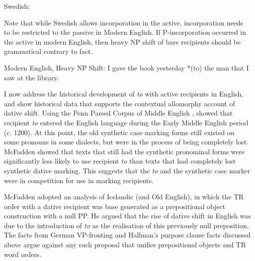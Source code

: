 		\begin{exe}
			\ex Swedish:\label{ex:Swedish-complex-act}
			\begin{xlist}
			\end{xlist}
		\end{exe}
		Note that while Swedish allows incorporation in the active, incorporation needs to be restricted to the passive in Modern English. If P-incorporation occurred in the active in modern English, then heavy NP shift of bare recipients should be grammatical contrary to fact.
		\begin{exe}
			\ex Modern English, Heavy NP Shift: I gave the book yesterday *(to) the man that I saw at the library.
		\end{exe}
		I now address the historical development of \textit{to} with active recipients in English, and show historical data that supports the contextual allomorphy account of dative shift. Using the Penn Parsed Corpus of Middle English \citep{Kroch.2000}, \cite{McFadden.2002} showed that recipient \textit{to} entered the English language during the Early Middle English period (c. 1200). At this point, the old synthetic case marking forms still existed on some pronouns in some dialects, but were in the process of being completely lost. McFadden showed that texts that still had the synthetic pronominal forms were significantly less likely to use recipient \textit{to} than texts that had completely lost synthetic dative marking. This suggests that the \textit{to} and the synthetic case marker were in competition for use in marking recipients.

		McFadden adopted an analysis of Icelandic (and Old English), in which the TR order with a dative recipient was base generated as a prepositional object construction with a null PP. He argued that the rise of dative shift in English was due to the introduction of \textit{to} as the realisation of this previously null preposition. The facts from German VP-fronting and Hallman's purpose clause facts discussed above argue against any such proposal that unifies prepositional objects and TR word orders.

